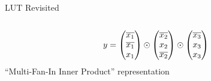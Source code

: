 \documentclass[../240906_cryptlab_flute.tex]{subfiles}
\begin{document}
\begin{frame}{LUT Revisited}
\begin{columns}
\begin{column}{0.4\textwidth}
{            }
            \pause
            \pause
            \begin{equation*}
                y
                = \begin{pmatrix} \overline{x_1} \\ \overline{x_1} \\ x_1 \end{pmatrix}
                   \odot \begin{pmatrix} \overline{x_2} \\ x_2 \\ \overline{x_2} \end{pmatrix}
                   \odot \begin{pmatrix} \overline{x_3} \\ x_3 \\ x_3 \end{pmatrix}
            \end{equation*}
            ``Multi-Fan-In Inner Product'' representation
        \end{column}
    \end{columns}
\end{frame}
\end{document}
